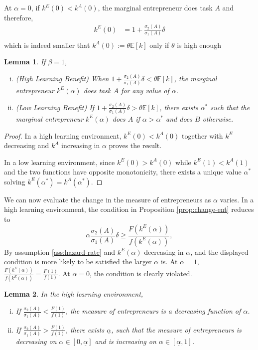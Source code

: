 \documentclass[12pt]{article}
\newtheorem{lemma}{Lemma}
\newcommand{\E}[1]{\mathbb E[#1]}
\begin{document}
At $\alpha=0$, if $k^E(0)<k^A(0)$, the marginal entrepreneur does task $A$ and therefore,
\begin{align*}
    k^E(0)&=1+\frac{\sigma_2(A)}{\sigma_1(A)}\delta\\ 
\end{align*}
which is indeed smaller that $k^A(0):=\theta \E k$ only if $\theta$ is high enough
%
\begin{lemma}\label{lem:beta=1}
    If $\beta=1$, 
    \begin{enumerate}[(i)]
        \item (High Learning Benefit) When $1+\frac{\sigma_2(A)}{\sigma_1(A)}\delta<\theta \E k$, the marginal entrepreneur $k^E(\alpha)$ does task $A$ for any value of $\alpha$.
        \item (Low Learning Benefit) If $1+\frac{\sigma_2(A)}{\sigma_1(A)}\delta>\theta \E k$, there exists $\alpha^*$ such that the marginal entrepreneur $k^E(\alpha)$ does $A$ if $\alpha>\alpha^*$ and does $B$ otherwise.
    \end{enumerate}
\end{lemma}
%
\begin{proof}
    In a high learning environment, $k^E(0)<k^A(0)$ together with $k^E$ decreasing and $k^A$ increasing in $\alpha$ proves the result.

    In a low learning environment, since $k^E(0)>k^A(0)$ while $k^E(1)<k^A(1)$ and the two functions have opposite monotonicity, there exists a unique value $\alpha^*$ solving $k^E(\alpha^*)= k^A(\alpha^*)$. 
\end{proof}
We can now evaluate the change in the measure of entrepreneurs as $\alpha$ varies. In a high learning environment, the condition in Proposition \ref{prop:change-ent} reduces to
%
\[
\alpha \frac{\sigma_2(A)}{\sigma_1(A)}\delta \geq \frac{F(k^E(\alpha))}{f(k^E(\alpha))}, 
\]
%
By assumption \ref{ass:hazard-rate} and $k^E(\alpha)$ decreasing in $\alpha$, and the displayed condition is more likely to be satisfied the larger $\alpha$ is. At $\alpha=1$, $\frac{F(k^E(\alpha))}{f(k^E(\alpha))}=\frac{F(1)}{f(1)}$. At $\alpha=0$, the condition is clearly violated.
\begin{lemma}
    In the high learning environment,
    \begin{enumerate}[(i)]
        \item If $\frac{\sigma_2(A)}{\sigma_1(A)}<\frac{F(1)}{f(1)}$, the measure of entrepreneurs is a decreasing function of $\alpha$.
        \item If $\frac{\sigma_2(A)}{\sigma_1(A)}>\frac{F(1)}{f(1)}$, there exists $\underline \alpha$, such that the measure of entrepreneurs is decreasing on $\alpha\in[0,\underline \alpha]$ and is increasing on $\alpha\in [\underline \alpha,1]$. 
    \end{enumerate}
\end{lemma}
\end{document}
